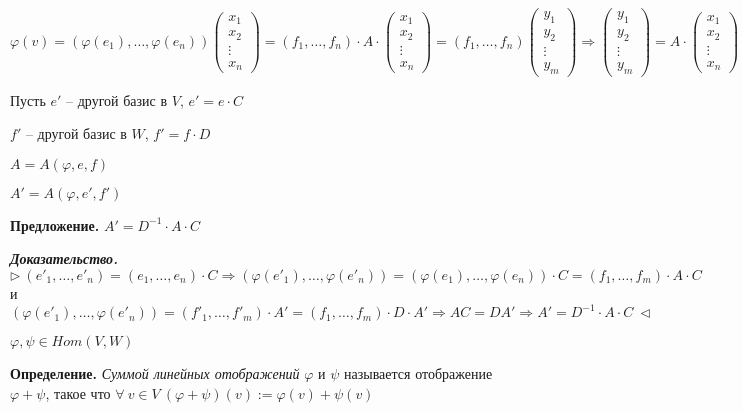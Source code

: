 $\varphi(v) = (\varphi(e_1), \dots, \varphi(e_n)) \begin{pmatrix} x_1 \\ x_2 \\ \vdots \\ x_n \end{pmatrix} = (f_1, \dots, f_n) \cdot A \cdot \begin{pmatrix} x_1 \\ x_2 \\ \vdots \\ x_n \end{pmatrix} = (f_1, \dots, f_n) \begin{pmatrix} y_1 \\ y_2 \\ \vdots \\ y_m \end{pmatrix} \Rightarrow \begin{pmatrix} y_1 \\ y_2 \\ \vdots \\ y_m \end{pmatrix} = A \cdot \begin{pmatrix} x_1 \\ x_2 \\ \vdots \\ x_n \end{pmatrix} \ \lhd$

\bigskip
Пусть $e'$ -- другой базис в $V$, $e' = e \cdot C$

$f'$ -- другой базис в $W$, $f' = f \cdot D$

$A = A(\varphi, e, f)$

$A' = A(\varphi, e', f')$

\bigskip
\textbf{Предложение.} $A' = D^{-1} \cdot A \cdot C$

\bigskip
\textbf{\textit{Доказательство.}} $\rhd \ (e'_1, \dots, e'_n) = (e_1, \dots, e_n) \cdot C \Rightarrow (\varphi(e'_1), \dots, \varphi(e'_n)) = (\varphi(e_1), \dots, \varphi(e_n)) \cdot C = (f_1, \dots, f_m) \cdot A \cdot C$ и $(\varphi(e'_1), \dots, \varphi(e'_n)) = (f'_1, \dots, f'_m) \cdot A' = (f_1, \dots, f_m) \cdot D \cdot A' \Rightarrow AC = DA' \Rightarrow A' = D^{-1} \cdot A \cdot C \ \lhd$ 

\bigskip
$\varphi, \psi \in Hom(V, W)$

\bigskip
\textbf{Определение.} \textit{Суммой линейных отображений} $\varphi$ и $\psi$ называется отображение $\varphi + \psi$, такое что $\forall \ v \in V \ (\varphi + \psi) (v) := \varphi(v) + \psi(v)$ 

